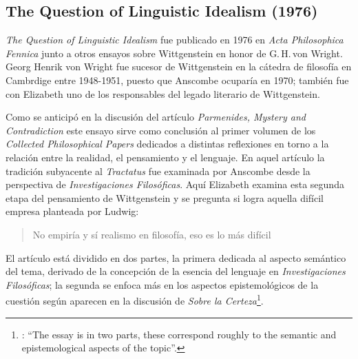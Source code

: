 \subsection{The Question of Linguistic Idealism (1976)}

\emph{The Question of Linguistic Idealism} fue publicado en 1976 en \emph{Acta Philosophica Fennica} junto a otros ensayos sobre Wittgenstein en honor de G.\,H.\,von Wright. Georg Henrik von Wright fue sucesor de Wittgenstein en la cátedra de filosofía en Cambrdige entre 1948-1951, puesto que Anscombe ocuparía en 1970; también fue con Elizabeth uno de los responsables del legado literario de Wittgenstein.

Como se anticipó en la discusión del artículo \emph{Parmenides, Mystery and Contradiction} este ensayo sirve como conclusión al primer volumen de los \emph{Collected Philosophical Papers} dedicados a distintas reflexiones en torno a la relación entre la realidad, el pensamiento y el lenguaje. En aquel artículo la tradición subyacente al \emph{Tractatus} fue examinada por Anscombe desde la perspectiva de \emph{Investigaciones Filosóficas}. Aquí Elizabeth examina esta segunda etapa del pensamiento de Wittgenstein y se pregunta si logra aquella difícil empresa planteada por Ludwig: \blockquote[{\Cite[VI, 23]{wittgenstein1956remmathes}}
]{No empiría y sí realismo en filosofía, eso es lo más difícil}.

El artículo está dividido en dos partes, la primera dedicada al aspecto semántico del tema, derivado de la concepción de la esencia del lenguaje en \emph{Investigaciones Filosóficas}; la segunda se enfoca más en los aspectos epistemológicos de la cuestión según aparecen en la discusión de \emph{Sobre la Certeza}\footnote{\cite[Cf.][215]{teichmann2008ans}: \enquote{The essay is in two parts, these correspond roughly to the semantic and epistemological aspects of the topic}.}.


